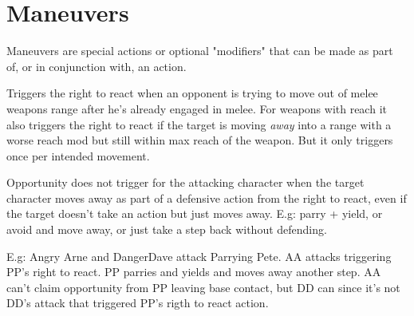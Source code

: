 \closeskillslist

































\section*{Maneuvers}


Maneuvers are special actions or optional "modifiers" that can be made as part of, or in conjunction with, an action.

\openskillslist


Triggers the right to react when an opponent is trying to move out of melee weapons range after he's already engaged in melee. For weapons with reach it also triggers the right to react if the target is moving \emph{away} into a range with a worse reach mod but still within max reach of the weapon. But it only triggers once per intended movement.

Opportunity does not trigger for the attacking character when the target character moves away as part of a defensive action from the right to react, even if the target doesn't take an action but just moves away. E.g: parry + yield, or avoid and move away, or just take a step back without defending.

E.g: Angry Arne and DangerDave attack Parrying Pete. AA attacks triggering PP's right to react. PP parries and yields and moves away another step. AA can't claim opportunity from PP leaving base contact, but DD can since it's not DD's attack that triggered PP's rigth to react action.

